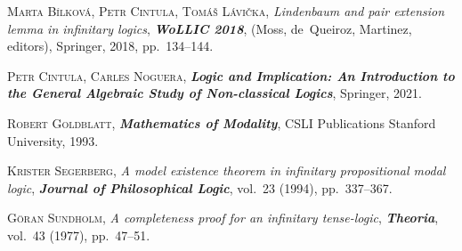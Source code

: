 \documentclass[bsl,meeting]{asl}
\begin{document}
%
\begin{thebibliography}{10}

{\scshape Marta B{\'{i}}lkov{\'{a}}, Petr Cintula, Tom\' a\v s L{\'{a}}vi{\v{c}}ka},
{\itshape Lindenbaum and pair extension lemma in infinitary logics},
{\bfseries\itshape WoLLIC 2018},
(Moss, de~Queiroz, Martinez, editors),
Springer,
2018,
pp.~134--144.

{\scshape Petr Cintula, Carles Noguera},
{\bfseries\itshape  Logic and Implication: An Introduction to the General Algebraic Study of Non-classical Logics},
Springer,
2021.

{\scshape Robert Goldblatt},
{\bfseries\itshape Mathematics of Modality},
CSLI Publications Stanford University,
1993.
 
{\scshape Krister Segerberg},
{\itshape A model existence theorem in infinitary propositional modal logic},
{\bfseries\itshape Journal of Philosophical Logic},
vol.~23 (1994), pp.~337--367.
 

{\scshape G\" oran Sundholm},
{\itshape A completeness proof for an infinitary tense-logic},
{\bfseries\itshape Theoria},
vol.~43 (1977), pp.~47--51.




%
\end{thebibliography}


\vspace*{-0.5\baselineskip}
\end{document}
